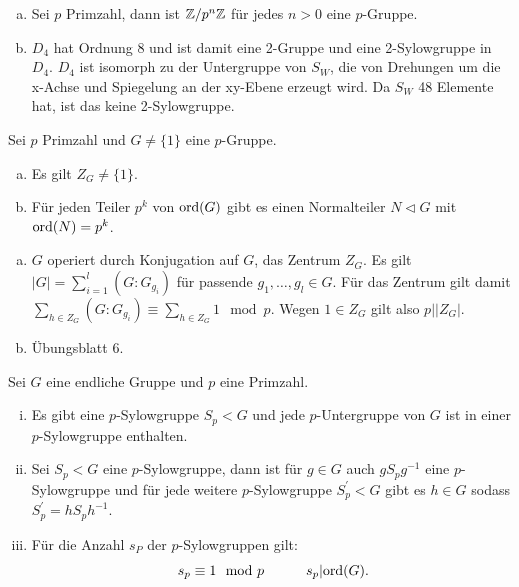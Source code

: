 \begin{beispiel}
  \begin{enumerate}[(a)]
  \item Sei \(p\) Primzahl, dann ist \(\mathbb{Z}/p^n\mathbb{Z}\) für jedes \(n>0\) eine \(p\)-Gruppe.
  \item \(D_4\) hat Ordnung 8 und ist damit eine 2-Gruppe und eine 2-Sylowgruppe in \(D_4\). \(D_4\) ist isomorph zu der Untergruppe von \(S_W\), die von Drehungen um die x-Achse und Spiegelung an der xy-Ebene erzeugt wird. Da \(S_W\) 48 Elemente hat, ist das keine 2-Sylowgruppe.
  \end{enumerate}
\end{beispiel}


\begin{lemma}
  Sei \(p\) Primzahl und \(G\neq\{1\}\) eine \(p\)-Gruppe.
  \begin{enumerate}[(a)]
  \item Es gilt \(Z_G\neq\{1\}\).
  \item Für jeden Teiler \(p^k\) von \(\mathrm{ord}(G)\) gibt es einen Normalteiler \(N\triangleleft G\) mit \(\mathrm{ord}(N)=p^k\).
  \end{enumerate}
\end{lemma}

\begin{beweis}
  \begin{enumerate}[(a)]
  \item \(G\) operiert durch Konjugation auf \(G\), das Zentrum \(Z_G\).
    Es gilt \(|G|=\sum_{i=1}^l (G : G_{g_i})\) für passende \(g_1,\dots,g_l\in G\).
    Für das Zentrum gilt damit \(\sum_{h\in Z_G}(G : G_{g_i})\equiv \sum_{h\in Z_G}1 \mod p\).
    Wegen \(1\in Z_G\) gilt also \(p||Z_G|\).
  \item Übungsblatt 6.
  \end{enumerate}
\end{beweis}
\begin{satz}
  Sei \(G\) eine endliche Gruppe und \(p\) eine Primzahl.
  \begin{enumerate}[(i)]
  \item Es gibt eine \(p\)-Sylowgruppe \(S_p<G\) und jede \(p\)-Untergruppe von \(G\) ist in einer \(p\)-Sylowgruppe enthalten.
  \item Sei \(S_p<G\) eine \(p\)-Sylowgruppe, dann ist für \(g\in G\) auch \(gS_pg^{-1}\) eine \(p\)-Sylowgruppe und für jede weitere \(p\)-Sylowgruppe \(S_p^\prime<G\) gibt es \(h\in G\) sodass \(S_p^\prime=hS_ph^{-1}\).
  \item Für die Anzahl \(s_P\) der \(p\)-Sylowgruppen gilt:
    \[
     s_p \equiv 1 \mod p\quad\quad \quad s_p|\ord(G)\rlap{.}
    \]
  \end{enumerate}
\end{satz}

